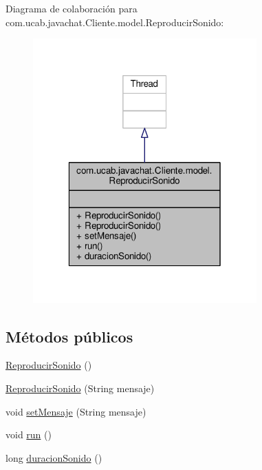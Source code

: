 Diagrama de colaboración para com.\-ucab.\-javachat.\-Cliente.\-model.\-Reproducir\-Sonido\-:\nopagebreak
\begin{figure}[H]
\begin{center}
\leavevmode
\includegraphics[width=244pt]{classcom_1_1ucab_1_1javachat_1_1_cliente_1_1model_1_1_reproducir_sonido__coll__graph}
\end{center}
\end{figure}
\subsection*{Métodos públicos}
\begin{DoxyCompactItemize}
\item 
\hyperlink{classcom_1_1ucab_1_1javachat_1_1_cliente_1_1model_1_1_reproducir_sonido_ac10d27e817edf62839046eb5f07aa236}{Reproducir\-Sonido} ()
\item 
\hyperlink{classcom_1_1ucab_1_1javachat_1_1_cliente_1_1model_1_1_reproducir_sonido_aaed28ce271a5d5a7975ef77c8ae26274}{Reproducir\-Sonido} (String mensaje)
\item 
void \hyperlink{classcom_1_1ucab_1_1javachat_1_1_cliente_1_1model_1_1_reproducir_sonido_a00ae7bbb07322bf4d4b578c0d10b34bb}{set\-Mensaje} (String mensaje)
\item 
void \hyperlink{classcom_1_1ucab_1_1javachat_1_1_cliente_1_1model_1_1_reproducir_sonido_ac8f472ebd53121c63b932d0264dfa917}{run} ()
\item 
long \hyperlink{classcom_1_1ucab_1_1javachat_1_1_cliente_1_1model_1_1_reproducir_sonido_aa251ecd4cbf7251b58ec572a5d3f4656}{duracion\-Sonido} ()
\end{DoxyCompactItemize}


